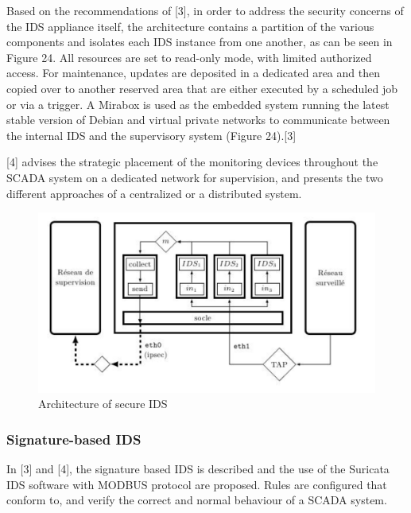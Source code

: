 \documentclass[11pt,]{article}
\begin{document}
Based on the recommendations of {[}3{]}, in order to address the
security concerns of the IDS appliance itself, the architecture contains
a partition of the various components and isolates each IDS instance
from one another, as can be seen in Figure 24. All resources are set to
read-only mode, with limited authorized access. For maintenance, updates
are deposited in a dedicated area and then copied over to another
reserved area that are either executed by a scheduled job or via a
trigger. A Mirabox is used as the embedded system running the latest
stable version of Debian and virtual private networks to communicate
between the internal IDS and the supervisory system (Figure 24).{[}3{]}

{[}4{]} advises the strategic placement of the monitoring devices
throughout the SCADA system on a dedicated network for supervision, and
presents the two different approaches of a centralized or a distributed
system.

\begin{figure}[h]

{\centering \includegraphics{thesis_files/figure-latex/unnamed-chunk-36-1} 

}

\caption{Architecture of secure IDS }\label{fig:unnamed-chunk-36}
\end{figure}

\subsubsection{Signature-based IDS}\label{signature-based-ids}

In {[}3{]} and {[}4{]}, the signature based IDS is described and the use
of the Suricata IDS software with MODBUS protocol are proposed. Rules
are configured that conform to, and verify the correct and normal
behaviour of a SCADA system.
\end{document}
